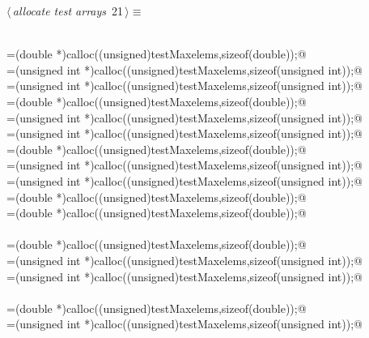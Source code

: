 \documentclass[12pt]{article}
\begin{document}
\begin{flushleft} \small
\begin{minipage}{\linewidth}\label{scrap9}\raggedright\small
{} $\langle\,${\itshape allocate test arrays}\nobreak\ {\footnotesize {21}}$\,\rangle\equiv$
\vspace{-1ex}
\begin{list}{}{} \item
\mbox{}\verb@@\\
\mbox{}\verb@newHmat=(double *)calloc((unsigned)testMaxelems,sizeof(double));@\\
\mbox{}\verb@newHmatj=(unsigned int *)calloc((unsigned)testMaxelems,sizeof(unsigned int));@\\
\mbox{}\verb@newHmati=(unsigned int *)calloc((unsigned)testMaxelems,sizeof(unsigned int));@\\
\mbox{}\verb@qmat=(double *)calloc((unsigned)testMaxelems,sizeof(double));@\\
\mbox{}\verb@qmatj=(unsigned int *)calloc((unsigned)testMaxelems,sizeof(unsigned int));@\\
\mbox{}\verb@qmati=(unsigned int *)calloc((unsigned)testMaxelems,sizeof(unsigned int));@\\
\mbox{}\verb@bmat=(double *)calloc((unsigned)testMaxelems,sizeof(double));@\\
\mbox{}\verb@bmatj=(unsigned int *)calloc((unsigned)testMaxelems,sizeof(unsigned int));@\\
\mbox{}\verb@bmati=(unsigned int *)calloc((unsigned)testMaxelems,sizeof(unsigned int));@\\
\mbox{}\verb@rootr=(double *)calloc((unsigned)testMaxelems,sizeof(double));@\\
\mbox{}\verb@rooti=(double *)calloc((unsigned)testMaxelems,sizeof(double));@\\
\mbox{}\verb@@\\
\mbox{}\verb@annihil=(double *)calloc((unsigned)testMaxelems,sizeof(double));@\\
\mbox{}\verb@annihilj=(unsigned int *)calloc((unsigned)testMaxelems,sizeof(unsigned int));@\\
\mbox{}\verb@annihili=(unsigned int *)calloc((unsigned)testMaxelems,sizeof(unsigned int));@\\
\mbox{}\verb@@\\
\mbox{}\verb@theR=(double *)calloc((unsigned)testMaxelems,sizeof(double));@\\
\mbox{}\verb@theRj=(unsigned int *)calloc((unsigned)testMaxelems,sizeof(unsigned int));@\\

\end{list}
\end{minipage}
\end{flushleft}
\end{document}
